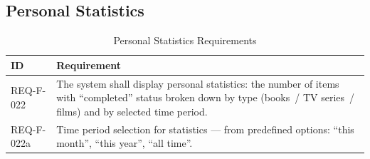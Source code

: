 \subsection{Personal Statistics}

\begin{table}[h]
\caption{Personal Statistics Requirements}
\label{tab:stat}
\begin{tabular}{L{2.5cm} L{11.5cm}}
\toprule
\textbf{ID} & \textbf{Requirement} \\
\midrule
REQ-F-022 & The system shall display personal statistics: the number of items with ``completed'' status broken down by type (books~/ TV series~/ films) and by selected time period.  \\
\addlinespace
REQ-F-022a & Time period selection for statistics --- from predefined options: ``this month'', ``this year'', ``all time''.  \\
\bottomrule
\end{tabular}
\end{table}
